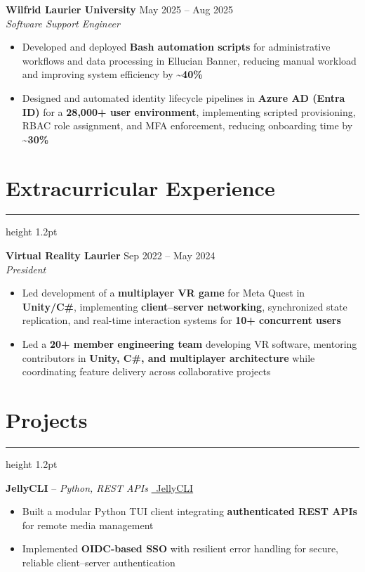 \documentclass[11pt]{article}
\newcommand{\divider}{\hrule height 1.2pt \vspace{6pt}}
\newcommand{\rolelocdates}[3]{\textbf{#1} \hfill #3\\\textit{#2}}
\begin{document}
    \rolelocdates{Wilfrid Laurier University}{Software Support Engineer}{May 2025 -- Aug 2025}
    \begin{itemize}
        \item Developed and deployed \textbf{Bash automation scripts} for administrative workflows and data processing in Ellucian Banner, reducing manual workload and improving system efficiency by \textbf{\textasciitilde40\%}        
        \item Designed and automated identity lifecycle pipelines in \textbf{Azure AD (Entra ID)} for a \textbf{28,000+ user environment}, implementing scripted provisioning, RBAC role assignment, and MFA enforcement, reducing onboarding time by \textbf{\textasciitilde30\%}    
    \end{itemize}
    
    \section{Extracurricular Experience}
    \divider
    
    \rolelocdates{Virtual Reality Laurier}
    {President}
    {Sep 2022 -- May 2024}
    \begin{itemize}
        \item Led development of a \textbf{multiplayer VR game} for Meta Quest in \textbf{Unity/C\#}, implementing \textbf{client--server networking}, synchronized state replication, and real-time interaction systems for \textbf{10+ concurrent users}
        \item Led a \textbf{20+ member engineering team} developing VR software, mentoring contributors in \textbf{Unity, C\#, and multiplayer architecture} while coordinating feature delivery across collaborative projects    
\end{itemize}

    \section{Projects}
    \divider

    \textbf{JellyCLI} – \textit{Python, REST APIs} \hfill \href{https://github.com/daudk3/JellyCLI}{\faGithub\ JellyCLI}\\
    \begin{itemize}
        \item Built a modular Python TUI client integrating \textbf{authenticated REST APIs} for remote media management
        \item Implemented \textbf{OIDC-based SSO} with resilient error handling for secure, reliable client--server authentication    
    \end{itemize}
    
\end{document}
